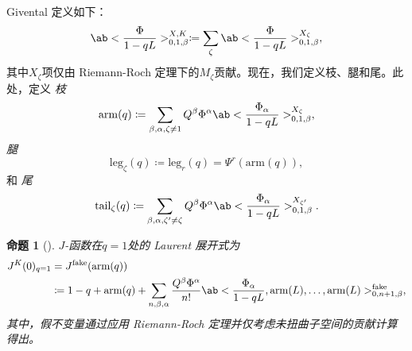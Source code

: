 \documentclass{amsart}
\newtheorem{prop}[thm]{命题}
\theoremstyle{definition}
\theoremstyle{remark}
\theoremstyle{plain}
\theoremstyle{definition}
\theoremstyle{remark}
\newcommand{\mr}[1]{\mathrm{#1}}
\newcommand{\1}{\mathbf{1}}
\newcommand{\2}{\mathbf{2}}
\newcommand{\3}{\mathbf{3}}
\begin{document}
%
%

Givental 定义如下：
\[ \ab<\frac{\Phi}{1-qL}>_{0,1,\beta}^{X,K} \coloneqq \sum_{\zeta} \ab<\frac{\Phi}{1-qL}>_{0,1,\beta}^{X_{\zeta}}, \]
其中\(X_{\zeta}\)项仅由 Riemann-Roch 定理下的\(M_{\zeta}\)贡献。现在，我们定义枝、腿和尾。此处，定义 \textit{ 枝}
\[ \mr{arm}(q) \coloneqq \sum_{\beta, \alpha, \zeta \neq 1} Q^{\beta} \Phi^{\alpha}\ab<\frac{\Phi_{\alpha}}{1-qL}>_{0,1,\beta}^{X_{\zeta}}, \]
\textit{ 腿}
\[ \mr{leg}_{\zeta}(q) \coloneqq \mr{leg}_r(q) = \Psi^r (\mr{arm}(q)), \]
和 \textit{ 尾}
\[ \mr{tail}_{\zeta}(q) \coloneqq \sum_{\beta, \alpha, \zeta' \neq \zeta} Q^{\beta} \Phi^{\alpha} \ab<\frac{\Phi_{\alpha}}{1-qL}>_{0,1,\beta}^{X_{\zeta'}}. \]

\begin{prop}[{\cite{GiventalTonita2014}}]
\(J\)-函数在\(q = 1\)处的 Laurent 展开式为
    \begin{align*}
        J^K(0)_{q=1} &= J^{\mr{fake}}(\mr{arm}(q)) \\
        &\coloneqq 1-q + \mr{arm}(q) + \sum_{n,\beta,\alpha} \frac{Q^{\beta}\Phi^{\alpha}}{n!} \ab<\frac{\Phi_{\alpha}}{1-qL}, \mr{arm}(L), \ldots, \mr{arm}(L)>_{0,n+1,\beta}^{\mr{fake}},
    \end{align*}
其中，假不变量通过应用 Riemann-Roch 定理并仅考虑未扭曲子空间的贡献计算得出。
\end{prop}
\end{document}
